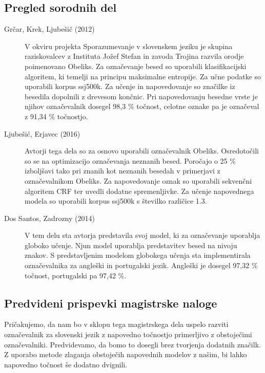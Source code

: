 \documentclass[a4paper, 12pt]{article}
\begin{document}
\subsection{Pregled sorodnih del}

\begin{description}
  \item [Grčar, Krek, Ljubešič (2012) \cite{Grcar2012}] V okviru projekta Sporazumevanje v slovenskem jeziku je skupina raziskovalcev z Instituta Jožef Stefan in zavoda Trojina razvila orodje poimenovano Obeliks. Za označevanje besed so uporabili klasifikacijski algoritem, ki temelji na principu maksimalne entropije. Za učne podatke so uporabili korpus ssj500k. Za učenje in napovedovanje so značilke iz besedila dopolnili z drevesom končnic. Pri napovedovanju besedne vrste je njihov označevalnik dosegel 98,3 \% točnost, celotne oznake pa je označeval z 91,34 \% točnostjo.\\
  \item [Ljubešić, Erjavec (2016) \cite{Ljubesic2016}] Avtorji tega dela so za osnovo uporabili označevalnik Obeliks. Osredotočili so se na optimizacijo označevanja neznanih besed. Poročajo o 25 \% izboljšavi tako pri znanih kot neznanih besedah v primerjavi z označevalnikom Obeliks. Za napovedovanje oznak so uporabili sekvenčni algoritem CRF ter uvedli dodatne spremenljivke. Za učenje napovednega modela so uporabili korpus ssj500k s številko različice 1.3.
  \item [Dos Santos, Zadrozny (2014) \cite{Santos2014}] V tem delu sta avtorja predstavila svoj model, ki za označevanje uporablja globoko učenje. Njun model uporablja predstavitev besed na nivoju znakov. S predstavljenim modelom globokega učenja sta implementirala označevalnika za angleški in portugalski jezik. Angleški je dosegel 97,32 \% točnost, portugalski pa 97,42 \%.

\end{description}

\subsection{Predvideni prispevki magistrske naloge}

Pričakujemo, da nam bo v sklopu tega magistrskega dela uspelo razviti označevalnik za slovenski jezik z napovedno točnostjo primerljivo z obstoječimi označevalniki. Predvidevamo, da bomo to dosegli brez tvorjenja dodatnih značilk.\\
Z  uporabo metode zlaganja obstoječih napovednih modelov z našim, bi lahko napovedno točnost še dodatno dvignili.
\end{document}
